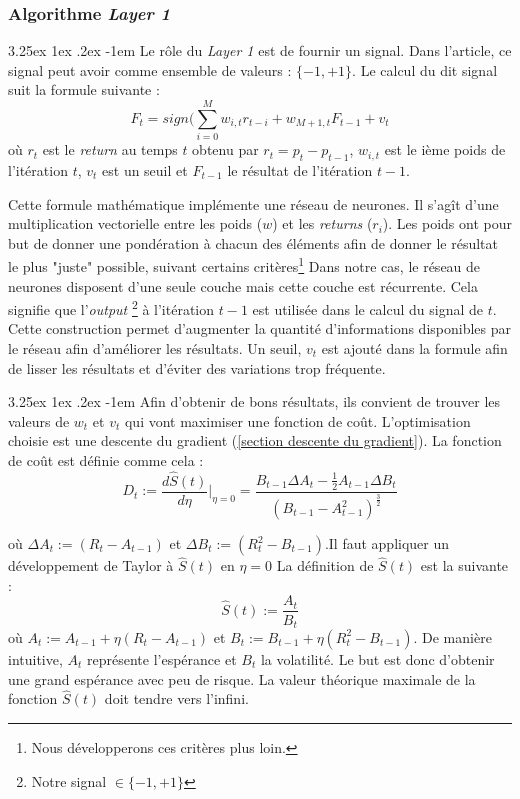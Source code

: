 \documentclass[a4paper, 11pt]{article}
\makeatletter
\renewcommand\paragraph{\@startsection{paragraph}{5}{\z@}%
  {3.25ex \@plus1ex \@minus.2ex}%
  {-1em}%
  {\normalfont\normalsize\bfseries}}
\makeatother
\begin{document}
\subsubsection{Algorithme \textit{Layer 1}}
\paragraph{}
Le rôle du \textit{Layer 1} est de fournir un signal. Dans l'article, ce signal peut avoir comme ensemble de valeurs : $\{-1,+1\}$. Le calcul du dit
signal suit la formule suivante \cite{fx_trading}:
$$F_t = sign(\sum_{i=0}^M w_{i,t} r_{t-i} + w_{M+1,t} F_{t-1} + v_t$$
où $r_t$ est le \textit{return} au temps $t$ obtenu par $r_t = p_t - p_{t-1}$, $w_{i,t}$ est le ième poids de l'itération $t$, $v_t$ est un seuil et
$F_{t-1}$ le résultat de l'itération $t-1$.

Cette formule mathématique implémente une réseau de neurones. Il s'agît d'une multiplication vectorielle entre les poids ($w$) et les \textit{returns}
($r_i$). Les poids ont pour but de donner une pondération à chacun des éléments afin de donner le résultat le plus "juste" possible, suivant certains
critères\footnote{Nous développerons ces critères plus loin.}
Dans notre cas, le réseau de neurones disposent d'une seule couche mais cette couche est récurrente. Cela signifie que l'\textit{output}
\footnote{Notre signal $\in \{-1,+1\}$} à l'itération $t-1$ est utilisée dans le calcul du signal de $t$. Cette construction permet d'augmenter
la quantité d'informations disponibles par le réseau afin d'améliorer les résultats.
Un seuil, $v_t$ est ajouté dans la formule afin de lisser les résultats et d'éviter des variations trop fréquente.

\paragraph{}
Afin d'obtenir de bons résultats, ils convient de trouver les valeurs de $w_t$ et $v_t$ qui vont maximiser une fonction de coût. L'optimisation choisie
est une descente du gradient (\ref{section descente du gradient}). La fonction de coût est définie comme cela :
$$D_t := \frac{d\widehat{S}(t)}{d\eta}|_{\eta=0} = \frac{B_{t-1}\Delta A_t - \frac{1}{2} A_{t-1}\Delta B_t}{(B_{t-1} - A_{t-1}^2)^{\frac{3}{2}}}$$

où $\Delta A_t := (R_t - A_{t-1})$ et $\Delta B_t := (R_t^2 - B_{t-1})$.Il faut appliquer un développement de Taylor à $\widehat{S}(t)$ en $\eta=0$
La définition de $\widehat{S}(t)$ est la suivante :
$$\widehat{S}(t) := \frac{A_t}{B_t}$$
où $A_t := A_{t-1} + \eta (R_t - A_{t-1})$ et $B_t := B_{t-1} + \eta (R_t^2 - B_{t-1})$.
De manière intuitive, $A_t$ représente l'espérance et $B_t$ la volatilité. Le but est donc d'obtenir une grand espérance avec peu de risque. La valeur
théorique maximale de la fonction $\widehat{S}(t)$ doit tendre vers l'infini.
\end{document}
